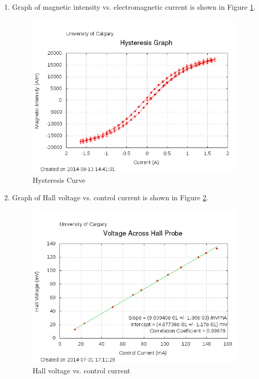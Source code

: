 \begin{enumerate}[resume]
\item Graph of magnetic intensity vs. electromagnetic current is shown in Figure \ref{fig:HMGraph1}.
\begin{figure}[!ht]
\center
\includegraphics{Hall-Effect-and-Magnetic-Hysteresis-Graph1.png}
\caption{Hysteresis Curve}
\label{fig:HMGraph1}
\end{figure}

\item Graph of Hall voltage vs. control current is shown in Figure \ref{fig:HMGraph2}.
\begin{figure}[!ht]
\center
\includegraphics{Hall-Effect-and-Magnetic-Hysteresis-Graph2.png}
\caption{Hall voltage vs. control current}
\label{fig:HMGraph2}
\end{figure}


\end{enumerate}
